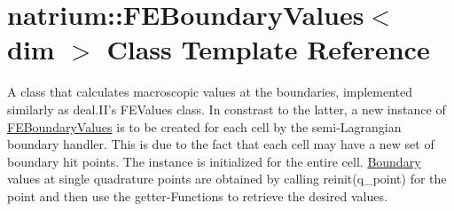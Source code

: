 \hypertarget{classnatrium_1_1FEBoundaryValues}{
\section{natrium::FEBoundaryValues$<$ dim $>$ Class Template Reference}
\label{classnatrium_1_1FEBoundaryValues}
}


A class that calculates macroscopic values at the boundaries, implemented similarly as deal.II's FEValues class. In constrast to the latter, a new instance of \hyperlink{classnatrium_1_1FEBoundaryValues}{FEBoundaryValues} is to be created for each cell by the semi-\/Lagrangian boundary handler. This is due to the fact that each cell may have a new set of boundary hit points. The instance is initialized for the entire cell. \hyperlink{classnatrium_1_1Boundary}{Boundary} values at single quadrature points are obtained by calling reinit(q\_\-point) for the point and then use the getter-\/Functions to retrieve the desired values.  


